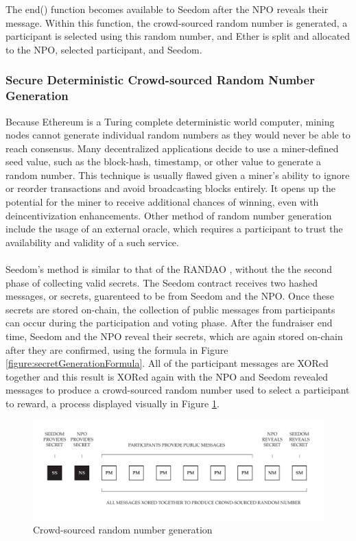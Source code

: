 \documentclass[11pt]{article}
\begin{document}
The end() function becomes available to Seedom after the NPO reveals their message. Within this function, the crowd-sourced random number is generated, a participant is selected using this random number, and Ether is split and allocated to the NPO, selected participant, and Seedom.

\subsubsection{Secure Deterministic Crowd-sourced Random Number Generation}
\label{sec:secureDeterministicCrowdSourcedRandomNumberGeneration}

Because Ethereum is a Turing complete deterministic world computer, mining nodes cannot generate individual random numbers as they would never be able to reach consensus. Many decentralized applications decide to use a miner-defined seed value, such as the block-hash, timestamp, or other value to generate a random number. This technique is usually flawed given a miner's ability to ignore or reorder transactions and avoid broadcasting blocks entirely. It opens up the potential for the miner to receive additional chances of winning, even with deincentivization enhancements. Other method of random number generation include the usage of an external oracle, which requires a participant to trust the availability and validity of a such service.\\\\
Seedom's method is similar to that of the RANDAO \cite{2}, without the the second phase of collecting valid secrets. The Seedom contract receives two hashed messages, or secrets, guarenteed to be from Seedom and the NPO. Once these secrets are stored on-chain, the collection of public messages from participants can occur during the participation and voting phase. After the fundraiser end time, Seedom and the NPO reveal their secrets, which are again stored on-chain after they are confirmed, using the formula in Figure \ref{figure:secretGenerationFormula}. All of the participant messages are XORed together and this result is XORed again with the NPO and Seedom revealed messages to produce a crowd-sourced random number used to select a participant to reward, a process displayed visually in Figure \ref{figure:crowdsourcedRandomNumberGeneration}.

\begin{figure}[H]
\begin{center}
\includegraphics[width=1.0\textwidth]{./graphics/crowd-sourced-random-number-generation.pdf}
\caption{Crowd-sourced random number generation}
\label{figure:crowdsourcedRandomNumberGeneration}
\end{center}
\end{figure}
\end{document}
